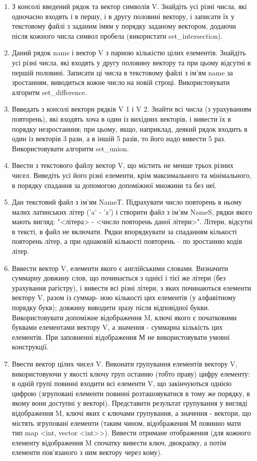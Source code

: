\documentclass[a5paper,titlepage,openany,twoside,draft]{book_unv}%
\begin{document}
\begin{enumerate}
\item
З консолі введений рядок та вектор символів V. 
Знайдіть усі різні числа, які одночасно входять
і в першу, і в другу половині вектору, і записати їх 
у текстовому файлі з заданим імям у порядку заданому вектором, додаючи
після кожного числа символ пробела (використати set\_intersection).
\item
Даний рядок name і вектор V з парною кількістю цілих елементів.
 Знайдіть усі різні числа, які входять у другу половину
вектору та при цьому відсутні в першій половині. Записати 
ці числа в текстовому файлі з ім'ям name за зростанням,
виводиться кожне число на новій строці. Використовувати алгоритм set\_difference.
\item
Ввведать з консолі вектори рядків V 1 і V 2. Знайти всі числа (з урахуванням повторень),
 які входять хоча в один із вихідних векторів, і вивести їх
в порядку незростанння; при цьому, якщо, наприклад, деякий рядок
входить в один із векторів 3 рази, а в іншій 5 разів, то його надо вивести 5 раз.
Використовувати алгоритм set\_union.
\item
Ввести з текстового файлу вектор V, що містить не менше трьох різних чисел.
Виведіть усі його різні елементи, крім максимального та мінімального, 
в порядку спадання за допомогою допоміжної множини та без неї.
\item
  Дан текстовий файл з ім'ям NameT. Підрахувати число повторень в ньому
  малих латинських літер ('a' - 'z') і створити файл з ім'ям NameS,
  рядки якого мають вигляд: "\textless{}літера\textgreater{} -
  \textless{}число повторень даної літери\textgreater{}". Літери,
  відсутні в тексті, в файл не включати. Рядки впорядкувати за спаданням
  кількості повторень літер, а при однаковій кількості повторень -- по
  зростанню кодів літер.

\item
Вввести вектор V, елементи якого є англійськими словами. Визначити суммарну довжину
слов, що починається з однієї і тієї же літери (без урахування рагістру),
 і вивести всі різні літери, з яких починаються елементи вектору V, разом із суммар-
ною кількості цих елементів (у алфавітному порядку букв); довжину виводити зразу 
після відповідної букви. Використовувати допоміжне відображення M, ключі якого є початковими буквами
 елементами вектору V, а значення - суммарна кількість цих елементів. 
При заповненні відображения М не використовувати умовні конструкції.

\item
Ввести вектор цілих чисел V. Виконати групування елементів вектору V,
 використовуючи у якості ключу груп останню (тобто праву) 
цифру елементу: в одній групі повинні входити всі елементи V,
що закінчуються однією цифрою (згруповані 
елементи повинні розташовуватися в тому же порядку, в якому вони
доступні у векторі). Представити результат групування у вигляді відображення M, 
ключі яких є ключами групування, а значення - вектори, що містять згруповані
елементи (таким чином, відображення М повинно мати тип
map <int, vector <int>>). Вивести отримане отображення (для кожного
елементу відображення M спочатку вивести ключ, двокрапку, а потім елементи
пов'язаного з ним вектору через кому).


\end{enumerate}
\end{document}
